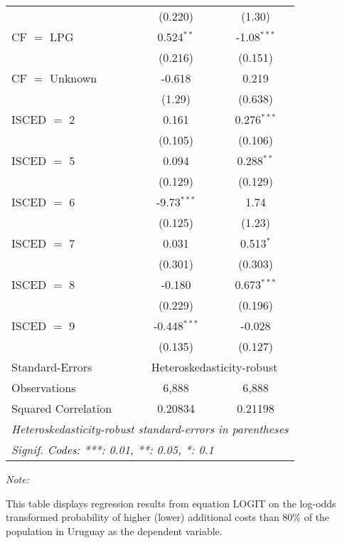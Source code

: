 \begin{table}[htbp!]
\begin{adjustbox}{width = 1\textwidth, max height = 0.95\textheight, center}
\begin{threeparttable}[b]
\begin{tabular}{lcc}
                                 & (0.220)        & (1.30)\\   
            CF $=$ LPG           & 0.524$^{**}$   & -1.08$^{***}$\\   
                                 & (0.216)        & (0.151)\\   
            CF $=$ Unknown       & -0.618         & 0.219\\   
                                 & (1.29)         & (0.638)\\   
            ISCED $=$ 2          & 0.161          & 0.276$^{***}$\\   
                                 & (0.105)        & (0.106)\\   
            ISCED $=$ 5          & 0.094          & 0.288$^{**}$\\   
                                 & (0.129)        & (0.129)\\   
            ISCED $=$ 6          & -9.73$^{***}$  & 1.74\\   
                                 & (0.125)        & (1.23)\\   
            ISCED $=$ 7          & 0.031          & 0.513$^{*}$\\   
                                 & (0.301)        & (0.303)\\   
            ISCED $=$ 8          & -0.180         & 0.673$^{***}$\\   
                                 & (0.229)        & (0.196)\\   
            ISCED $=$ 9          & -0.448$^{***}$ & -0.028\\   
                                 & (0.135)        & (0.127)\\   
            \midrule 
            Standard-Errors & \multicolumn{2}{c}{Heteroskedasticity-robust} \\ 
            Observations         & 6,888          & 6,888\\  
            Squared Correlation  & 0.20834        & 0.21198\\  
            \midrule \midrule
            \multicolumn{3}{l}{\emph{Heteroskedasticity-robust standard-errors in parentheses}}\\
            \multicolumn{3}{l}{\emph{Signif. Codes: ***: 0.01, **: 0.05, *: 0.1}}\\
         \end{tabular}
         
         \begin{tablenotes}\item \medskip \textit{Note:}
            \item This table displays regression results from equation LOGIT on the log-odds transformed probability of higher (lower) additional costs than 80\% of the population in Uruguay as the dependent variable. 
         \end{tablenotes}
      \end{threeparttable}
   \end{adjustbox}
\end{table}


